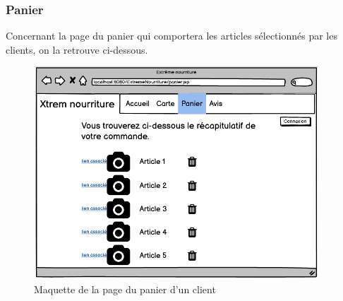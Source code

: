 \clearpage

\subsubsection{Panier}
Concernant la page du panier qui comportera les articles sélectionnés par les clients, on la retrouve ci-dessous.
\begin{figure}[H]
\begin{centering}
\includegraphics[width=0.95\textwidth,height=0.6\textheight]{images/panier.png}
\caption{Maquette de la page du panier d'un client}
\par
\end{centering}
\end{figure}

\clearpage


